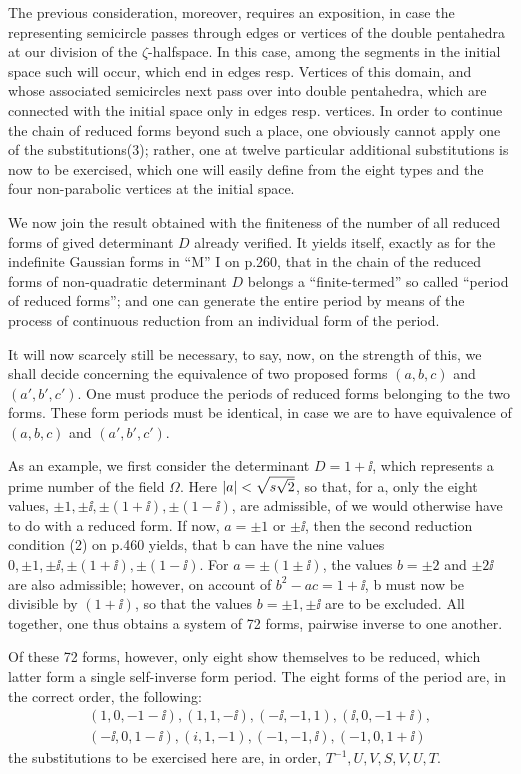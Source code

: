 The previous consideration, moreover, requires an exposition, in case the representing semicircle passes through edges or vertices of the double pentahedra at our division of the $\zeta$-halfspace. In this case, among the segments in the initial space such will occur, which end in edges resp. Vertices of this domain, and whose associated semicircles next pass over into double pentahedra, which are connected with the initial space only in edges resp. vertices. In order to continue the chain of reduced forms beyond such a place, one obviously cannot apply one of the substitutions(3); rather, one at twelve particular additional substitutions is now to be exercised, which one will easily define from the eight types and the four non-parabolic vertices at the initial space.

We now join the result obtained with the finiteness of the number of all reduced forms of gived determinant $D$ already verified. It yields itself, exactly as for the indefinite Gaussian forms in “M” I on p.260, that in the chain of the reduced forms of non-quadratic determinant $D$ belongs a “finite-termed” so called “period of reduced forms”; and one can generate the entire period by means of the process of continuous reduction from an individual form of the period.

It will now scarcely still be necessary, to say, now, on the strength of this, we shall decide concerning the equivalence of two proposed forms $(a,b,c)$ and $(a',b',c')$. One must produce the periods of reduced forms belonging to the two forms. These form periods must be identical, in case we are to have equivalence of $(a,b,c)$ and $(a',b',c')$.

As an example, we first consider the determinant $D=1+\ii$, which represents a prime number of the field $\Omega$. Here $\left|a\right|<\sqrt{s\sqrt{2}}$, so that, for a, only the eight values, $\pm 1, \pm\ii, \pm(1+\ii), \pm(1-\ii)$, are admissible, of we would otherwise have to do with a reduced form. If now, $a=\pm 1$ or $\pm\ii$, then the second reduction condition (2) on p.460 yields, that b can have the nine values $0, \pm 1, \pm\ii, \pm(1+\ii), \pm(1-\ii)$. For $a=\pm(1\pm\ii)$, the values $b=\pm 2$ and $\pm 2\ii$ are also admissible; however, on account of $b^2-ac=1+\ii$, b must now be divisible by $(1+\ii)$, so that the values $b=\pm 1, \pm\ii$ are to be excluded. All together, one thus obtains a system of 72 forms, pairwise inverse to one another.

Of these 72 forms, however, only eight show themselves to be reduced, which latter form a single self-inverse form period. The eight forms of the period are, in the correct order, the following:
\begin{align}
    (1,0,-1-\ii),(1,1,-\ii),(-\ii,-1,1),(\ii,0,-1+\ii),\\
    (-\ii,0,1-\ii),(i,1,-1),(-1,-1,\ii),(-1,0,1+\ii)
\end{align}
the substitutions to be exercised here are, in order, $T^{-1}, U, V, S, V, U, T$.

